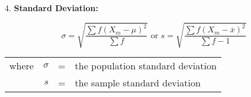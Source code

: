 4. \textbf{Standard Deviation: } 

$$ \sigma = \sqrt{\dfrac{\sum f(X_m - \mu)^2 }{\sum{f}}} \text{ or } s = \sqrt{\dfrac{\sum f(X_m - \overline{x})^2 }{\sum{f}-1}} $$

\begin{center}
\begin{tabular}{rrcl}

where & $\sigma $ & = & the population standard deviation \\
& $s$ & = & the sample standard deviation \\

\end{tabular} 
\end{center} 



